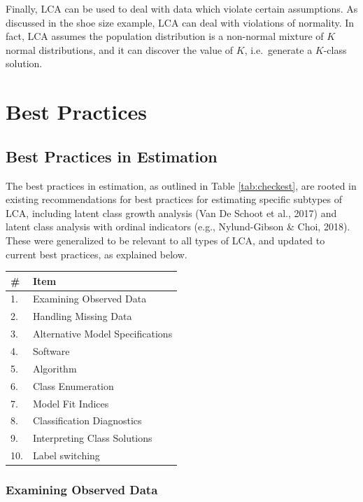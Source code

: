 \documentclass[
  ,man,floatsintext]{apa6}
\begin{document}
Finally, LCA can be used to deal with data which violate certain assumptions.
As discussed in the shoe size example, LCA can deal with violations of normality.
In fact, LCA assumes the population distribution is a non-normal mixture
of \(K\) normal distributions,
and it can discover the value of \(K\), i.e.~generate a \(K\)-class solution.

\hypertarget{best-practices}{%
\section{Best Practices}\label{best-practices}}

\hypertarget{best-practices-in-estimation}{%
\subsection{Best Practices in Estimation}\label{best-practices-in-estimation}}

The best practices in estimation, as outlined in Table \ref{tab:checkest},
are rooted in existing recommendations for best practices
for estimating specific subtypes of LCA,
including latent class growth analysis (Van De Schoot et al., 2017)
and latent class analysis with ordinal indicators (e.g., Nylund-Gibson \& Choi, 2018).
These were generalized to be relevant to all types of LCA,
and updated to current best practices, as explained below.

\begin{tabular}[t]{l|l}
\hline
\# & Item\\
\hline
1. & Examining Observed Data\\
\hline
2. & Handling Missing Data\\
\hline
3. & Alternative Model Specifications\\
\hline
4. & Software\\
\hline
5. & Algorithm\\
\hline
6. & Class Enumeration\\
\hline
7. & Model Fit Indices\\
\hline
8. & Classification Diagnostics\\
\hline
9. & Interpreting Class Solutions\\
\hline
10. & Label switching\\
\hline
\end{tabular}

\hypertarget{examining-observed-data}{%
\subsubsection{Examining Observed Data}\label{examining-observed-data}}
\end{document}

